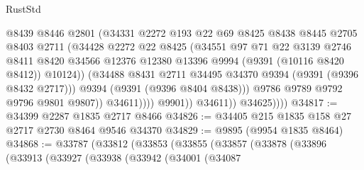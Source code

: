 \begin{lexlean}{RustStd}
\begin{coremodule}
                                @8439
                                @8446
                                @2801
                                (@34331
                                  @2272
                                  @193
                                  @22
                                  @69
                                  @8425
                                  @8438
                                  @8445
                                  @2705
                                  @8403
                                  @2711
                                  (@34428
                                    @2272
                                    @22
                                    @8425
                                    (@34551
                                      @97
                                      @71
                                      @22
                                      @3139
                                      @2746
                                      @8411
                                      @8420
                                      @34566
                                      @12376
                                      @12380
                                      @13396
                                      @9994
                                      (@9391 (@10116 @8420 @8412))
                                      @10124))
                                  (@34488
                                    @8431
                                    @2711
                                    @34495
                                    @34370
                                    @9394
                                    (@9391 (@9396 @8432 @2717)))
                                  @9394
                                  (@9391 (@9396 @8404 @8438)))
                                @9786
                                @9789
                                @9792
                                @9796
                                @9801
                                @9807))
                            @34611))))
                    @9901))
                @34611))
            @34625))))
@34817 := @34399 @2287 @1835 @2717 @8466
@34826 := @34405 @215 @1835 @158 @27 @2717 @2730 @8464 @9546 @34370
@34829 := @9895 (@9954 @1835 @8464)
@34868 := @33787
    (@33812
      (@33853
        (@33855
          (@33857
            (@33878
              (@33896
                (@33913
                  (@33927
                    (@33938
                      (@33942
                        (@34001
                          (@34087

\end{coremodule}
\end{lexlean}
